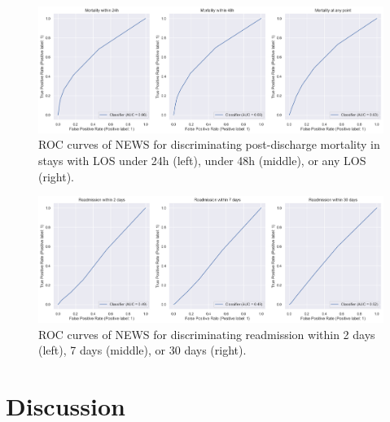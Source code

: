 \documentclass[10pt,journal, compsoc]{IEEEtran}
\begin{document}
\begin{figure}[htbp]
    \centering
    \includegraphics[width=\textwidth]{img/30daymortality_roc.png}
    \caption{ROC curves of NEWS for discriminating post-discharge mortality in stays with LOS under 24h (left), under 48h (middle), or any LOS (right).}
    \label{fig:30day_roc}
\end{figure}

\begin{figure}[htbp]
    \centering
    \includegraphics[width=\textwidth]{img/readmission_roc.png}
    \caption{ROC curves of NEWS for discriminating readmission within 2 days (left), 7 days (middle), or 30 days (right).}
    \label{fig:readmission_roc}
\end{figure}

\section{Discussion}
\end{document}
